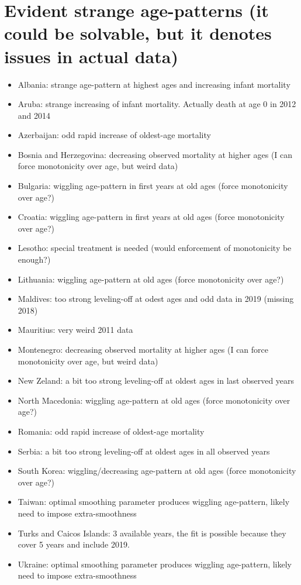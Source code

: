 \documentclass{article}
\begin{document}
	\section*{Evident strange age-patterns (it could be solvable, but it denotes issues in actual data)}
	
	\begin{itemize}
		\item Albania: strange age-pattern at highest ages and increasing infant mortality
		\item Aruba: strange increasing of infant mortality. Actually death at age 0 in 2012 and 2014
		\item Azerbaijan: odd rapid increase of oldest-age mortality
		\item Bosnia and Herzegovina: decreasing observed mortality at higher ages (I can force monotonicity over age, but weird data)
		\item Bulgaria: wiggling age-pattern in first years at old ages (force monotonicity over age?)
		\item Croatia: wiggling age-pattern in first years at old ages (force monotonicity over age?)
		\item Lesotho: special treatment is needed (would enforcement of monotonicity be enough?)
		\item Lithuania: wiggling age-pattern at old ages (force monotonicity over age?)
		\item Maldives: too strong leveling-off at odest ages and odd data in 2019 (missing 2018)
		\item Mauritius: very weird 2011 data
		\item Montenegro: decreasing observed mortality at higher ages (I can force monotonicity over age, but weird data)
		\item New Zeland: a bit too strong leveling-off at oldest ages in last observed years
		\item North Macedonia: wiggling age-pattern at old ages (force monotonicity over age?)
		\item Romania: odd rapid increase of oldest-age mortality
		\item Serbia: a bit too strong leveling-off at oldest ages in all observed years
		\item South Korea: wiggling/decreasing age-pattern at old ages (force monotonicity over age?)
		\item Taiwan: optimal smoothing parameter produces wiggling age-pattern, likely need to impose extra-smoothness
		\item Turks and Caicos Islands: 3 available years, the fit is possible because they cover 5 years and include 2019. 
		\item Ukraine: optimal smoothing parameter produces wiggling age-pattern, likely need to impose extra-smoothness
	\end{itemize}
	
\end{document}
